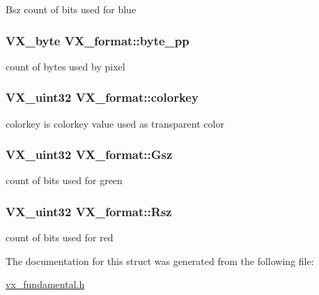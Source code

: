 Bsz count of bits used for blue \hypertarget{structVX__format_ab8b944e1dee823f20fc1fbb20a3ffc2d}{
\subsubsection[{byte\-\_\-pp}]{\setlength{\rightskip}{0pt plus 5cm}V\-X\-\_\-byte V\-X\-\_\-format\-::byte\-\_\-pp}}\label{structVX__format_ab8b944e1dee823f20fc1fbb20a3ffc2d}
count of bytes used by pixel \hypertarget{structVX__format_ad1f7e23d7858315574c57c6bafac8d39}{
\subsubsection[{colorkey}]{\setlength{\rightskip}{0pt plus 5cm}V\-X\-\_\-uint32 V\-X\-\_\-format\-::colorkey}}\label{structVX__format_ad1f7e23d7858315574c57c6bafac8d39}
colorkey is colorkey value used as transparent color \hypertarget{structVX__format_a3c77f13c487325f5cd424e8d2f630fd4}{
\subsubsection[{Gsz}]{\setlength{\rightskip}{0pt plus 5cm}V\-X\-\_\-uint32 V\-X\-\_\-format\-::\-Gsz}}\label{structVX__format_a3c77f13c487325f5cd424e8d2f630fd4}
count of bits used for green \hypertarget{structVX__format_a859b157f238ed3495a926a866077313e}{
\subsubsection[{Rsz}]{\setlength{\rightskip}{0pt plus 5cm}V\-X\-\_\-uint32 V\-X\-\_\-format\-::\-Rsz}}\label{structVX__format_a859b157f238ed3495a926a866077313e}
count of bits used for red 

The documentation for this struct was generated from the following file\-:\begin{DoxyCompactItemize}
\item 
\hyperlink{vx__fundamental_8h}{vx\-\_\-fundamental.\-h}\end{DoxyCompactItemize}
